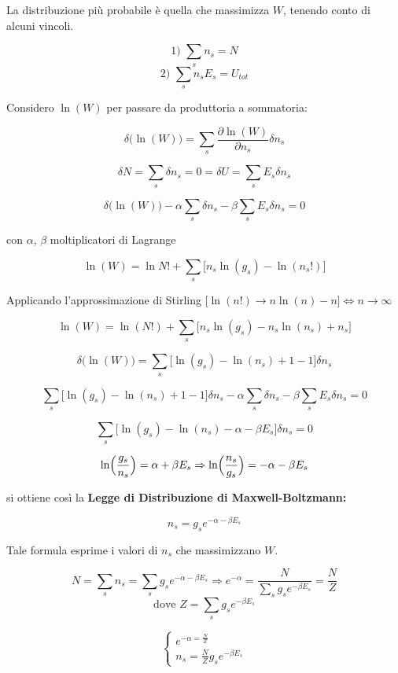 \begin{enumerate}[label=\Roman*]
La distribuzione più probabile è quella che massimizza $W$, tenendo conto di alcuni vincoli.

$$ \mbox{1) } \sum_s n_s = N  $$
$$ \mbox{2) } \sum_s n_s E_s = U_{tot}  $$

Considero $\ln(W)$ per passare da produttoria a sommatoria:

$$ \delta \bigl( \ln(W)  \bigr) = \sum_s \frac{\partial \ln(W) }{ \partial n_s } \delta n_s  $$

$$ \delta N = \sum_s \delta n_s = 0 = \delta U = \sum_s E_s \delta n_s $$

$$ \delta \bigl( \ln(W)  \bigr) - \alpha \sum_s \delta n_s - \beta \sum_s E_s \delta n_s = 0 $$

con $\alpha$, $\beta$ moltiplicatori di Lagrange

$$ \ln(W) = \ln N! + \sum_s \bigl[  n_s \ln(g_s) - \ln(n_s!)  \bigr] $$

Applicando l'approssimazione di Stirling $ \bigl[  \ln(n!) \to n \ln(n) - n  \bigr] \iff n \to \infty $

$$ \ln(W) = \ln(N!) + \sum_s \bigl[  n_s \ln(g_s) - n_s \ln(n_s) + n_s \bigr] $$

$$ \delta \bigl( \ln(W) \bigr) = \sum_s \bigl[  \ln(g_s) - \ln(n_s) + 1 - 1 \bigr] \delta n_s $$

$$  \sum_s \bigl[  \ln(g_s) - \ln(n_s) + 1 - 1 \bigr] \delta n_s  - \alpha \sum_s \delta n_s - \beta \sum_s E_s \delta n_s = 0 $$

$$ \sum_s \bigl[  \ln(g_s) - \ln(n_s) - \alpha - \beta E_s \bigr] \delta n_s = 0  $$

$$  \ln \Bigl(  \frac{g_s}{n_s} \Bigr) = \alpha + \beta E_s  \Rightarrow \ln  \Bigl(  \frac{n_s}{g_s} \Bigr)  = - \alpha - \beta E_s  $$

si ottiene così la \textbf{Legge di Distribuzione di Maxwell-Boltzmann:}

$$ n_s = g_s e^{ - \alpha - \beta E_s } $$

Tale formula esprime i valori di $n_s$ che massimizzano $W$.

$$ N = \sum_s n_s = \sum_s g_s e^{- \alpha - \beta E_s} \Rightarrow e^{-\alpha} = \frac{N}{\sum_s g_s e^{ - \beta E_s }} = \frac{N}{Z} $$
$$\mbox{dove } Z = \sum_s g_s e^{ - \beta E_s } $$

\begin{equation}
\begin{cases}
	e^{- \alpha = \frac{N}{Z}} \\
	n_s = \frac{N}{Z} g_s e^{ - \beta E_s }
\end{cases}
\end{equation}




\end{enumerate}
